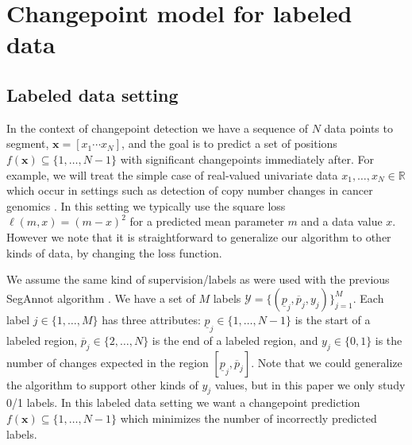 \documentclass[12pt]{article}
\begin{document}
\section{Changepoint model for labeled data}

\subsection{Labeled data setting}

In the context of changepoint detection we have a sequence of $N$ data points to segment,
$\mathbf x = [ x_1 \cdots x_N ]$, and the goal is to predict a set of positions $f(\mathbf x)\subseteq \{1, \dots, N-1\}$ with significant changepoints immediately after.
For example, we will treat the simple case of real-valued univariate data $x_1, \dots, x_N \in \mathbb R$ which occur in settings such as detection of copy number changes in cancer genomics \citep{HOCKING-penalties, Hocking2014}. In this setting we typically use the square loss $\ell(m, x)=(m-x)^2$ for a predicted mean parameter $m$ and a data value $x$. However we note that it is straightforward to generalize our algorithm to other kinds of data, by changing the loss function.

We assume the same kind of supervision/labels as were used with the previous SegAnnot algorithm \citep{Hocking2014}. We have a set of $M$ labels
$\mathcal Y=\{(\underline p_j, \overline p_j, y_j)\}_{j=1}^M$. Each label $j\in\{1,\dots, M\}$ has three attributes:
$\underline p_j\in\{1, \dots, N-1\}$ is the start of a labeled region,
$\overline p_j \in \{2, \dots, N\}$ is the end of a labeled region, and $y_j\in\{0,1\}$ is the number of changes expected in the region
$[\underline p_j, \overline p_j]$. 
Note that we could generalize the algorithm to support other kinds of $y_j$ values, but in this paper we only study 0/1 labels.
In this labeled data setting we want a changepoint prediction $f(\mathbf x)\subseteq \{1, \dots, N-1\}$ which minimizes the number of incorrectly predicted labels.
\end{document}
